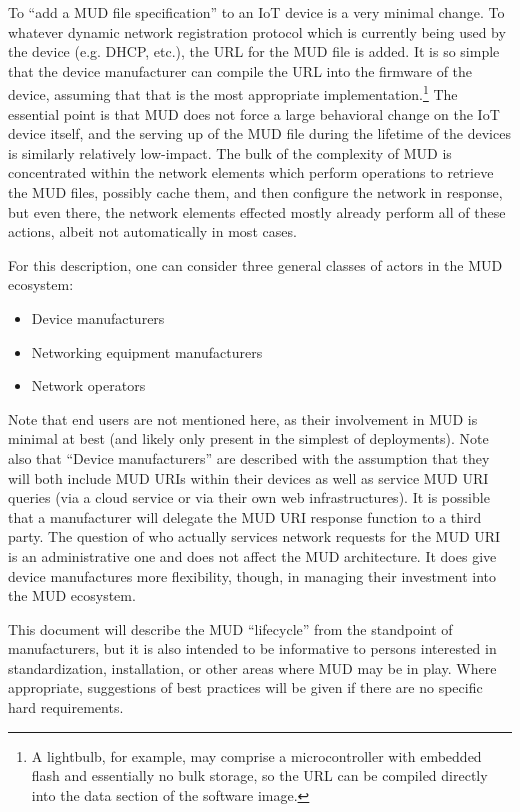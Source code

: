\documentclass[conference]{IEEEtran}
\begin{document}
To ``add a MUD file specification'' to an IoT device is a very minimal
change.  To whatever dynamic network registration protocol which is
currently being used by the device (e.g. DHCP, etc.), the URL for the
MUD file is added.  It is so simple that the device manufacturer can
compile the URL into the firmware of the device, assuming that that is
the most appropriate implementation.\footnote{A lightbulb, for
  example, may comprise a microcontroller with embedded flash and
  essentially no bulk storage, so the URL can be compiled directly
  into the data section of the software image.}  The essential point
is that MUD does not force a large behavioral change on the IoT device
itself, and the serving up of the MUD file during the lifetime of the
devices is similarly relatively low-impact.  The bulk of the
complexity of MUD is concentrated within the network elements which
perform operations to retrieve the MUD files, possibly cache them, and
then configure the network in response, but even there, the network
elements effected mostly already perform all of these actions, albeit
not automatically in most cases.

For this description, one can consider three general
classes of actors in the MUD ecosystem:
\begin{itemize}
\item Device manufacturers
\item Networking equipment manufacturers
\item Network operators
\end{itemize}

Note that end users are not mentioned here, as their involvement in
MUD is minimal at best (and likely only present in the simplest of
deployments).  Note also that ``Device manufacturers'' are described
with the assumption that they will both include MUD URIs within their
devices as well as service MUD URI queries (via a cloud service or via
their own web infrastructures).  It is possible that a manufacturer
will delegate the MUD URI response function to a third party.  The
question of who actually services network requests for the MUD URI is
an administrative one and does not affect the MUD architecture.  It
does give device manufactures more flexibility, though, in managing
their investment into the MUD ecosystem.

This document will describe the MUD ``lifecycle'' from the standpoint
of manufacturers, but it is also intended to be informative to persons
interested in standardization, installation, or other areas where MUD
may be in play.  Where appropriate, suggestions of best practices will
be given if there are no specific hard requirements.
\end{document}
